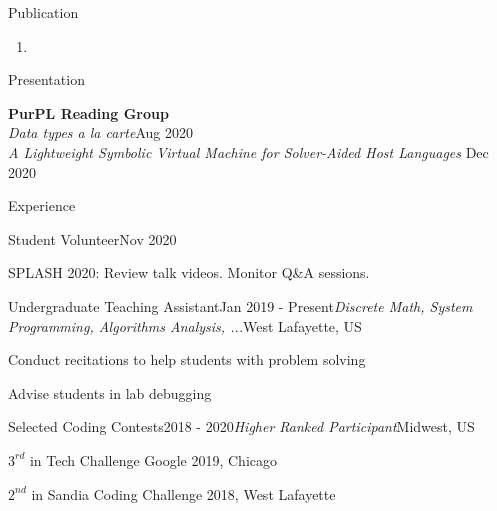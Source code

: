 \documentclass{resume} %
\begin{document}
\begin{rSection}{Publication}
\begin{enumerate}
    \item {}
\end{enumerate}








\end{rSection}

\begin{rSection}{Presentation}


\textbf{PurPL Reading Group} \\
\textit{Data types a la carte}\hfill Aug 2020\\
\textit{A Lightweight Symbolic Virtual Machine for Solver-Aided Host Languages} \hfill Dec 2020



\end{rSection}


\begin{rSection}{Experience}

\begin{rSubsection}{Student Volunteer}{Nov 2020}{}{}
\item SPLASH 2020: Review talk videos. Monitor Q\&A sessions.


\end{rSubsection}
\begin{rSubsection}{Undergraduate Teaching Assistant}{Jan 2019 - Present}{\textit{Discrete Math, System Programming, Algorithms Analysis, ...}}{West Lafayette, US}
\item Conduct recitations to help students with problem solving
\item Advise students in lab debugging
\end{rSubsection}

\begin{rSubsection}{Selected Coding Contests}{2018 - 2020}{\it Higher Ranked Participant}{Midwest, US}
\item $3^{rd}$ in Tech Challenge Google 2019, Chicago
\item $2^{nd}$ in Sandia Coding Challenge 2018, West Lafayette

\end{rSubsection}


\end{rSection}

\end{document}
